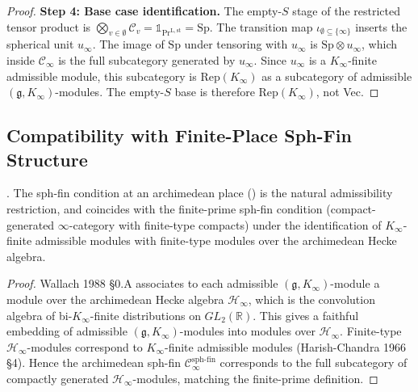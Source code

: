 \begin{proof}
\textbf{Step 4: Base case identification.} The empty-\(S\) stage of the
restricted tensor product is \(\bigotimes_{v \in \emptyset}\mathcal{C}_{v}
= \mathbb{1}_{\mathrm{Pr}^{\mathrm{L,st}}} = \mathrm{Sp}\). The
transition map \(\iota_{\emptyset \subseteq \{\infty\}}\) inserts the
spherical unit \(u_{\infty}\). The image of \(\mathrm{Sp}\) under
tensoring with \(u_{\infty}\) is \(\mathrm{Sp} \otimes u_{\infty}\), which
inside \(\mathcal{C}_{\infty}\) is the full subcategory generated by
\(u_{\infty}\). Since \(u_{\infty}\) is a \(K_{\infty}\)-finite admissible
module, this subcategory is \(\mathrm{Rep}(K_{\infty})\) as a
subcategory of admissible \((\mathfrak{g}, K_{\infty})\)-modules. The
empty-\(S\) base is therefore \(\mathrm{Rep}(K_{\infty})\), not Vec.
\end{proof}

\subsection{Compatibility with Finite-Place Sph-Fin Structure}

\begin{proposition}
\label{v4-arith:lacd:prop:uniformity-sph-fin}
\ClaimStatusProvedHere. The sph-fin condition at an archimedean
place () is the natural
admissibility restriction, and coincides with the finite-prime
sph-fin condition (compact-generated \(\infty\)-category with
finite-type compacts) under the identification of \(K_{\infty}\)-finite
admissible modules with finite-type modules over the archimedean
Hecke algebra.
\end{proposition}

\begin{proof}
Wallach 1988 \S0.A associates to each admissible
\((\mathfrak{g}, K_{\infty})\)-module a module over the archimedean
Hecke algebra \(\mathcal{H}_{\infty}\), which is the convolution
algebra of bi-\(K_{\infty}\)-finite distributions on \(GL_{2}(\mathbb{R})\).
This gives a faithful embedding of admissible
\((\mathfrak{g}, K_{\infty})\)-modules into modules over
\(\mathcal{H}_{\infty}\). Finite-type \(\mathcal{H}_{\infty}\)-modules
correspond to \(K_{\infty}\)-finite admissible modules
(Harish-Chandra 1966 \S4). Hence the archimedean sph-fin
\(\mathcal{C}_{\infty}^{\mathrm{sph\text{-}fin}}\) corresponds to the
full subcategory of compactly generated
\(\mathcal{H}_{\infty}\)-modules, matching the finite-prime definition.
\end{proof}

